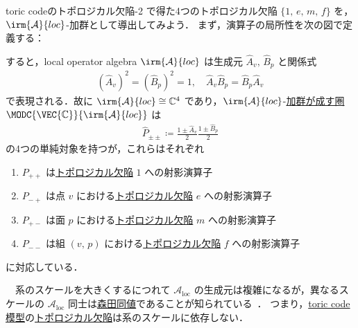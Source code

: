\documentclass[TQFT_main]{subfiles}
\begin{document}
\begin{myexample}[label=ex:toric-loc]{toric codeのトポロジカル欠陥-2}
    で得た4つのトポロジカル欠陥 $\{1,\, e,\, m,\, f\}$ を，$\irm{\mathcal{A}}{loc}$-加群として導出してみよう．
    まず，演算子の局所性を次の図で定義する：
    \begin{figure}[H]
        \centering
    \end{figure}%
    すると，local operator algebra $\irm{\mathcal{A}}{loc}$ は生成元 $\hat{A}_v,\, \hat{B}_p$ と関係式
    \begin{align}
        (\hat{A}_v)^2 = (\hat{B}_p)^2 = 1,\quad \hat{A}_v \hat{B}_p = \hat{B}_p \hat{A}_v
    \end{align}
    で表現される．故に $\irm{\mathcal{A}}{loc} \cong \mathbb{C}^4$ であり，$\irm{\mathcal{A}}{loc}$-\hyperref[def:moduleobj]{加群が成す圏} $\MODC{\VEC{\mathbb{C}}}{\irm{\mathcal{A}}{loc}}$ は
    \begin{align}
        \hat{P}_{\pm\pm} \coloneqq \frac{1 \pm \hat{A}_v}{2} \frac{1 \pm \hat{B}_p}{2}
    \end{align}
    の4つの単純対象を持つが，これらはそれぞれ
    \begin{enumerate}
        \item $P_{++}$ は\hyperref[def:TD]{トポロジカル欠陥} $1$ への射影演算子
        \item $P_{-+}$ は点 $v$ における\hyperref[def:TD]{トポロジカル欠陥} $e$ への射影演算子
        \item $P_{+-}$ は面 $p$ における\hyperref[def:TD]{トポロジカル欠陥} $m$ への射影演算子
        \item $P_{--}$ は組 $(v,\, p)$ における\hyperref[def:TD]{トポロジカル欠陥} $f$ への射影演算子
    \end{enumerate}
    に対応している．

    　系のスケールを大きくするにつれて $\mathcal{A}_{\text{loc}}$ の生成元は複雑になるが，異なるスケールの $\mathcal{A}_{\text{loc}}$ 同士は\hyperref[def:Morita-equiv]{森田同値}であることが知られている~\cite{Kitaev1997TC}．
    つまり，\hyperref[ex:toric-emf]{toric code模型}の\hyperref[def:TD]{トポロジカル欠陥}は系のスケールに依存しない．
\end{myexample}
\end{document}
